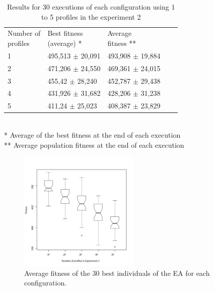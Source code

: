 \documentclass{sig-alternate}
\begin{document}
\begin{table}
\begin{center}
\caption{Results for 30 executions of each configuration using 1 to 5 profiles in the experiment 2}
\label{fig:exp2_30ex}
\begin{tabular}{lllll}
\hline\noalign{\smallskip}
\parbox[t]{2cm}{Number of\\ profiles}
& \parbox[t]{3cm}{Best fitness\\(average) *}
& \parbox[t]{3cm}{Average\\fitness **} \\
\noalign{\smallskip}
\hline
\noalign{\smallskip}
1 & 495,513 $\pm$ 20,091 & 493,908 $\pm$ 19,884 \\
2 & 471,206 $\pm$ 24,550 & 469,361 $\pm$ 24,015 \\
3 & 455,42 $\pm$ 28,240 & 452,787 $\pm$ 29,438 \\
4 & 431,926 $\pm$ 31,682 & 428,206 $\pm$ 31,238 \\
5 & 411,24 $\pm$ 25,023 & 408,387 $\pm$ 23,829 \\
\hline
\end{tabular}
\\
\** Average of the best fitness at the end of each execution\\
\*** Average population fitness  at the end of each execution \\

\end{center}
\end{table}

\begin{figure}[htb]
\centering

   \includegraphics[width=13.5pc] {img/exp2_v2.pdf}
\caption{Average fitness of the 30 best individuals of the EA for each configuration.}

\label{fig:graph}
\end{figure}
\end{document}
